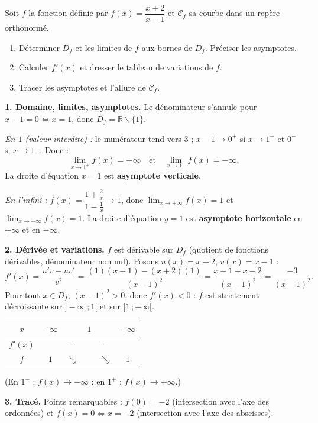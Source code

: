 \documentclass[11pt]{article}
\def\setminus{\mathbin{\backslash}}\let\smallsetminus\setminus
\begin{document}
\begin{exoresolu}
Soit $f$ la fonction définie par $f(x)=\dfrac{x+2}{x-1}$ et $\mathcal{C}_f$ sa courbe dans un repère orthonormé.
\begin{enumerate}
\item Déterminer $D_f$ et les limites de $f$ aux bornes de $D_f$. Préciser les asymptotes.
\item Calculer $f'(x)$ et dresser le tableau de variations de $f$.
\item Tracer les asymptotes et l'allure de $\mathcal{C}_f$.
\end{enumerate}
\tcblower
\textbf{1. Domaine, limites, asymptotes.} Le dénominateur s'annule pour $x-1=0 \Leftrightarrow x=1$, donc $D_f=\mathbb{R}\setminus\{1\}$.

\emph{En $1$ (valeur interdite) :} le numérateur tend vers $3$ ; $x-1\to 0^+$ si $x\to 1^+$ et $0^-$ si $x\to 1^-$. Donc :
\[ \lim_{x\to 1^+}f(x)=+\infty \quad\text{et}\quad \lim_{x\to 1^-}f(x)=-\infty. \]
La droite d'équation $x=1$ est \textbf{asymptote verticale}.

\emph{En l'infini :} $f(x)=\dfrac{1+\frac{2}{x}}{1-\frac{1}{x}}\to 1$, donc $\displaystyle\lim_{x\to+\infty}f(x)=1$ et $\displaystyle\lim_{x\to-\infty}f(x)=1$. La droite d'équation $y=1$ est \textbf{asymptote horizontale} en $+\infty$ et en $-\infty$.

\textbf{2. Dérivée et variations.} $f$ est dérivable sur $D_f$ (quotient de fonctions dérivables, dénominateur non nul). Posons $u(x)=x+2$, $v(x)=x-1$ :
\[ f'(x)=\frac{u'v-uv'}{v^2}=\frac{(1)(x-1)-(x+2)(1)}{(x-1)^2}=\frac{x-1-x-2}{(x-1)^2}=\frac{-3}{(x-1)^2}. \]
Pour tout $x\in D_f$, $(x-1)^2>0$, donc $f'(x)<0$ : $f$ est strictement décroissante sur $]-\infty\,;1[$ et sur $]1\,;+\infty[$.

\begin{center}
\begin{tabular}{|c|c|cc||cc|}\hline
$x$ & $-\infty$ & & $1$ & & $+\infty$ \\ \hline
$f'(x)$ & & $-$ & \text{||} & $-$ & \\ \hline
$f$ & $1$ & $\searrow$ & \text{||} & $\searrow$ & $1$ \\ \hline
\end{tabular}
\end{center}
(En $1^-$ : $f(x)\to-\infty$ ; en $1^+$ : $f(x)\to+\infty$.)

\textbf{3. Tracé.} Points remarquables : $f(0)=-2$ (intersection avec l'axe des ordonnées) et $f(x)=0\Leftrightarrow x=-2$ (intersection avec l'axe des abscisses).


\end{exoresolu}
\end{document}
